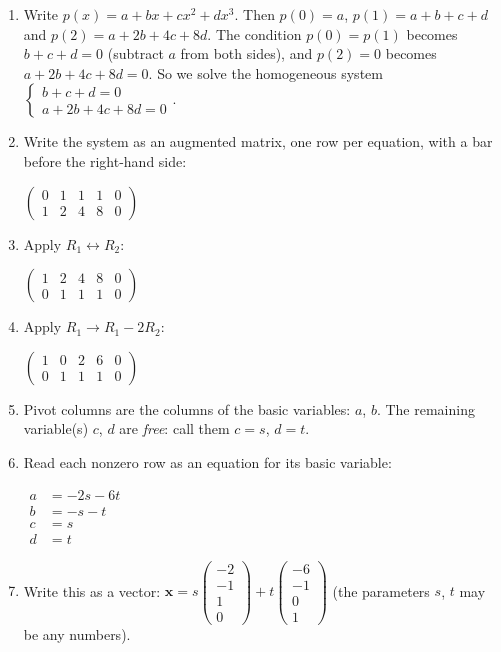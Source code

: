 \documentclass[11pt]{article}
\begin{document}
\begin{tcolorbox}[breakable,colback=ans,colframe=ansb,boxrule=0.5pt,left=4pt,right=4pt,top=2pt,bottom=2pt]\begin{enumerate}[leftmargin=3.1em,itemsep=1pt,topsep=1pt,label=\textbf{Step \arabic*.}]\item Write $p(x)=a+bx+cx^{2}+dx^{3}$. Then $p(0)=a$, $p(1)=a+b+c+d$ and $p(2)=a+2b+4c+8d$. The condition $p(0)=p(1)$ becomes $b+c+d=0$ (subtract $a$ from both sides), and $p(2)=0$ becomes $a+2b+4c+8d=0$. So we solve the homogeneous system $\begin{cases}b+c+d=0\\ a+2b+4c+8d=0\end{cases}$.
\item Write the system as an augmented matrix, one row per equation, with a bar before the right-hand side:\par\smallskip $\displaystyle \left(\begin{array}{cccc|c}0 & 1 & 1 & 1 & 0 \\ 1 & 2 & 4 & 8 & 0\end{array}\right)$
\item Apply $R_1\leftrightarrow R_2$:\par\smallskip $\displaystyle \left(\begin{array}{cccc|c}1 & 2 & 4 & 8 & 0 \\ 0 & 1 & 1 & 1 & 0\end{array}\right)$
\item Apply $R_1\to R_1-2R_2$:\par\smallskip $\displaystyle \left(\begin{array}{cccc|c}1 & 0 & 2 & 6 & 0 \\ 0 & 1 & 1 & 1 & 0\end{array}\right)$
\item Pivot columns are the columns of the basic variables: $a$, $b$. The remaining variable(s) $c$, $d$ are \emph{free}: call them $c=s$, $d=t$.
\item Read each nonzero row as an equation for its basic variable:\par\smallskip $\displaystyle\begin{aligned}a&=-2s-6t\\ b&=-s-t\\ c&=s\\ d&=t\end{aligned}$
\item Write this as a vector: $\displaystyle \mathbf x=s\begin{pmatrix}-2\\-1\\1\\0\end{pmatrix}+t\begin{pmatrix}-6\\-1\\0\\1\end{pmatrix}$ (the parameters $s$, $t$ may be any numbers).

\end{enumerate}
\end{tcolorbox}
\end{document}
